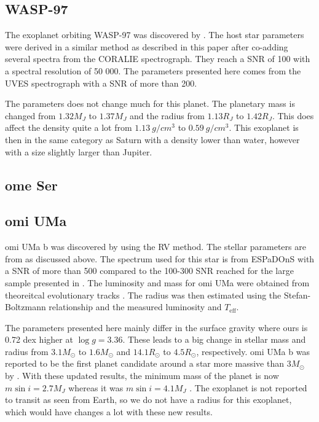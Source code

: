 \documentclass{aa}
\begin{document}
\subsection{WASP-97}
\label{sub:WASP-97}
The exoplanet orbiting WASP-97 was discovered by \citet{Hellier2014}. The host
star parameters were derived in a similar method as described in this paper
after co-adding several spectra from the CORALIE spectrograph. They reach a
SNR of 100 with a spectral resolution of 50 000. The parameters presented here
comes from the UVES spectrograph with a SNR of more than 200.

The parameters does not change much for this planet. The planetary mass is
changed from $1.32M_J$ to $1.37M_J$ and the radius from $1.13R_J$ to $1.42R_J$.
This does affect the density quite a lot from $\SI{1.13}{g/cm^3}$ to
$\SI{0.59}{g/cm^3}$. This exoplanet is then in the same category as Saturn with
a density lower than water, however with a size slightly larger than Jupiter.


\subsection{ome Ser}
\label{sub:ome_Ser}



\subsection{omi UMa}
\label{sub:omiUMa}
omi UMa b was discovered by \citet{Sato2012} using the RV method. The stellar
parameters are from \citet{Takeda2008} as discussed above. The spectrum used for
this star is from ESPaDOnS with a SNR of more than 500 compared to the 100-300
SNR reached for the large sample presented in \citet{Takeda2008}. The luminosity
and mass for omi UMa were obtained from theoreitcal evolutionary tracks
\citep[see][and references therein]{Sato2012}. The radius was then estimated
using the Stefan-Boltzmann relationship and the measured luminosity and
$T_\mathrm{eff}$.

The parameters presented here mainly differ in the surface gravity where ours is
0.72 dex higher at $\log g=3.36$. These leads to a big change in stellar mass
and radius from $3.1M_\odot$ to $1.6M_\odot$ and $14.1R_\odot$ to $4.5R_\odot$,
respectively. omi UMa b was reported to be the first planet candidate around a
star more massive than $3M_\odot$ by \citet{Sato2012}. With these updated
results, the minimum mass of the planet is now $m\sin i=2.7M_J$ whereas it was
$m\sin i=4.1M_J$ \citep{Sato2012}. The exoplanet is not reported to transit as
seen from Earth, so we do not have a radius for this exoplanet, which would have
changes a lot with these new results.
\end{document}
